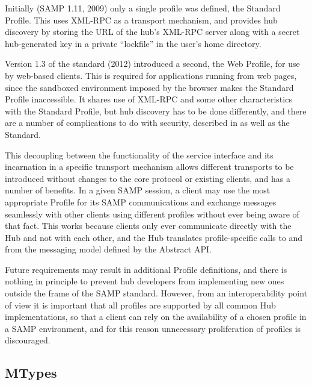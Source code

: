 \documentclass[5p]{elsarticle}
\begin{document}
Initially (SAMP 1.11, 2009)
only a single profile was defined, the Standard Profile.
This uses XML-RPC as a transport mechanism,
and provides hub discovery by storing the URL of the hub's XML-RPC server
along with a secret hub-generated key in a private ``lockfile''
in the user's home directory.

Version 1.3 of the standard (2012) introduced a second, the Web Profile,
for use by web-based clients.
This is required for applications running from web pages,
since the sandboxed environment imposed by the browser
makes the Standard Profile inaccessible.
It shares use of XML-RPC and some other characteristics with the
Standard Profile, but hub discovery has to be done differently,
and there are a number of complications to do with security,
described in \citet{adassxxi_paper} as well as the Standard.

This decoupling between the functionality of the service interface
and its incarnation in a specific transport mechanism
allows different transports to be introduced without changes to the core
protocol or existing clients, and has a number of benefits.
In a given SAMP session, a client may use the most appropriate
Profile for its SAMP communications and exchange
messages seamlessly with other clients using different profiles
without ever being aware of that fact.
This works because clients only ever
communicate directly with the Hub and not with each other,
and the Hub translates profile-specific calls to and from
the messaging model defined by the Abstract API.

Future requirements may result in additional Profile definitions,
and there is nothing in principle to prevent hub developers
from implementing new ones outside the frame of the SAMP standard.
However, from an interoperability point of view it is important
that all profiles are supported by all common Hub implementations,
so that a client can rely on the availability of a chosen profile
in a SAMP environment, and for this reason unnecessary proliferation
of profiles is discouraged.



\subsection{MTypes} \label{sec:mtypes}
\end{document}
